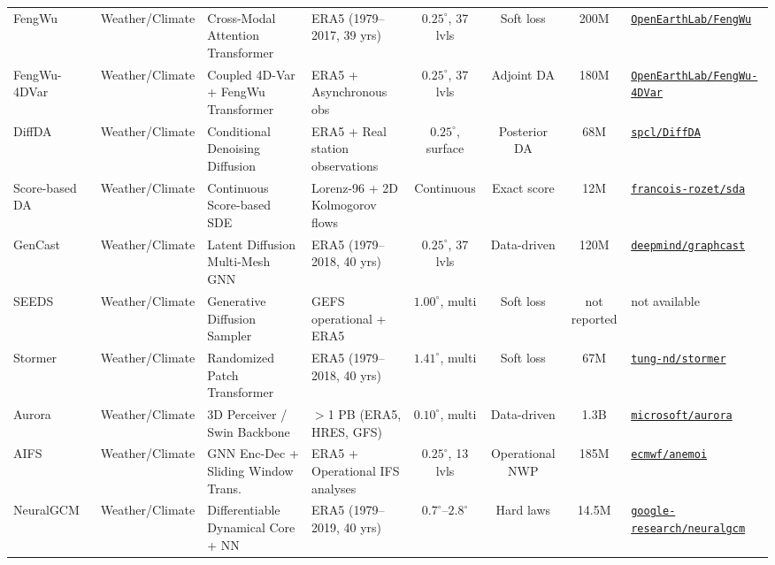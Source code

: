 \begin{table}[t]
{\begin{tabular}{@{}lp{2.0cm}p{3.0cm}p{3.4cm}cccp{3.0cm}@{}}
FengWu~\cite{chen2023fengwu} & Weather/Climate & Cross-Modal Attention Transformer & ERA5 (1979--2017, 39 yrs) & $0.25^\circ$, 37 lvls & Soft loss & 200M & \href{https://github.com/OpenEarthLab/FengWu}{\texttt{OpenEarthLab/FengWu}} \\
FengWu-4DVar~\cite{xiao2023fengwu4dvar} & Weather/Climate & Coupled 4D-Var + FengWu Transformer & ERA5 + Asynchronous obs & $0.25^\circ$, 37 lvls & Adjoint DA & 180M & \href{https://github.com/OpenEarthLab/FengWu-4DVar}{\texttt{OpenEarthLab/FengWu-4DVar}} \\
DiffDA~\cite{huang2024diffda} & Weather/Climate & Conditional Denoising Diffusion & ERA5 + Real station observations & $0.25^\circ$, surface & Posterior DA & 68M & \href{https://github.com/spcl/DiffDA}{\texttt{spcl/DiffDA}} \\
Score-based DA~\cite{rozet2023sda} & Weather/Climate & Continuous Score-based SDE & Lorenz-96 + 2D Kolmogorov flows & Continuous & Exact score & 12M & \href{https://github.com/francois-rozet/sda}{\texttt{francois-rozet/sda}} \\
GenCast~\cite{price2023gencast} & Weather/Climate & Latent Diffusion Multi-Mesh GNN & ERA5 (1979--2018, 40 yrs) & $0.25^\circ$, 37 lvls & Data-driven & 120M & \href{https://github.com/google-deepmind/graphcast}{\texttt{deepmind/graphcast}} \\
SEEDS~\cite{li2024seeds} & Weather/Climate & Generative Diffusion Sampler & GEFS operational + ERA5 & $1.00^\circ$, multi & Soft loss & not reported & not available \\
Stormer~\cite{nguyen2023stormer} & Weather/Climate & Randomized Patch Transformer & ERA5 (1979--2018, 40 yrs) & $1.41^\circ$, multi & Soft loss & 67M & \href{https://github.com/tung-nd/stormer}{\texttt{tung-nd/stormer}} \\
Aurora~\cite{bodnar2024aurora} & Weather/Climate & 3D Perceiver / Swin Backbone & $>$1 PB (ERA5, HRES, GFS) & $0.10^\circ$, multi & Data-driven & 1.3B & \href{https://github.com/microsoft/aurora}{\texttt{microsoft/aurora}} \\
AIFS~\cite{lang2024aifs} & Weather/Climate & GNN Enc-Dec + Sliding Window Trans. & ERA5 + Operational IFS analyses & $0.25^\circ$, 13 lvls & Operational NWP & 185M & \href{https://github.com/ecmwf/anemoi}{\texttt{ecmwf/anemoi}} \\
NeuralGCM~\cite{kochkov2024neuralgcm} & Weather/Climate & Differentiable Dynamical Core + NN & ERA5 (1979--2019, 40 yrs) & $0.7^\circ$--$2.8^\circ$ & Hard laws & 14.5M & \href{https://github.com/google-research/neuralgcm}{\texttt{google-research/neuralgcm}} \\

\end{tabular}}
\end{table}
